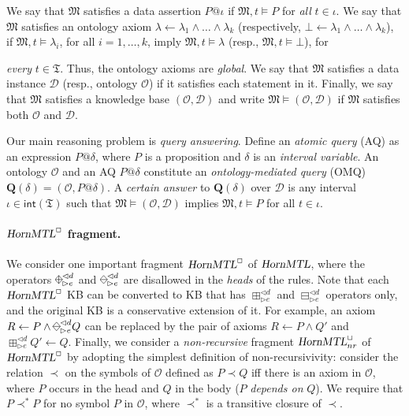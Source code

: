 \documentclass{article}
\newcommand{\Mmf}{\mathfrak{M}}
\renewcommand{\int}{\mathsf{int}}
\newcommand{\omq}{\boldsymbol Q}
\newcommand{\D}{\mathcal{D}}
\renewcommand{\O}{\mathcal{O}}
\newcommand{\diamondplus}{%
  \raisebox{-.15ex}{\begin{tikzpicture}
    \useasboundingbox (-0.7ex, -0.9ex) rectangle (0.7ex, 0.9ex);
    \node (w) at (-0.8ex,0) {};
    \node (e) at (+0.8ex,0) {};
    \node (s) at (0,-.9ex) {};
    \node (n) at (0,+.9ex) {};
    \draw (n.center) -- (e.center) -- (s.center) -- (w.center) -- (n.center);
    \draw (n.center) -- (s.center);
    \draw (e.center) -- (w.center);
  \end{tikzpicture}}}
\newcommand{\diamondminus}{%
  \raisebox{-.15ex}{\begin{tikzpicture}
    \useasboundingbox (-0.7ex, -0.9ex) rectangle (0.7ex, 0.9ex);
    \node (w) at (-0.8ex,0) {};
    \node (e) at (+0.8ex,0) {};
    \node (s) at (0,-.9ex) {};
    \node (n) at (0,+.9ex) {};
    \draw (n.center) -- (e.center) -- (s.center) -- (w.center) -- (n.center);
    \draw (e.center) -- (w.center);
  \end{tikzpicture}}}
\newcommand{\hMTL}{\textsl{HornMTL}}
\begin{document}
We say that $\Mmf$ satisfies a data assertion $P@\iota$ if $\Mmf, t \models P$ for \emph{all} $t \in \iota$. We say that $\Mmf$ satisfies an ontology axiom $\lambda \leftarrow \lambda_1 \land \dots \land \lambda_k$ (respectively, $\bot \leftarrow \lambda_1 \land \dots \land \lambda_k$), if $\Mmf, t \models \lambda_i$, for all $i = 1,\dots,k$, imply $\Mmf, t \models \lambda$ (resp., $\Mmf, t \models \bot$), for {\emph{every} $t \in \mathfrak{T}$.
Thus, the ontology axioms are \emph{global}. We say that $\Mmf$ satisfies a data instance $\D$ (resp., ontology $\O$) if it satisfies each statement in it. Finally, we say that $\Mmf$ satisfies a knowledge base $(\O, \D)$ and write $\Mmf \models (\O, \D)$ if $\Mmf$ satisfies both $\O$ and $\D$.

Our main reasoning problem is \emph{query answering}. Define an \emph{atomic query} (AQ) as an expression $P@\delta$, where $P$ is a proposition and $\delta$ is an \emph{interval variable}. An ontology $\O$ and an AQ $P@\delta$ constitute an \emph{ontology-mediated query} (OMQ) $\omq(\delta) = (\O,P@\delta)$. A \emph{certain answer} to $\omq(\delta)$ over $\D$ is any interval $\iota \in \int(\mathfrak{T})$ such that $\Mmf \models (\O, \D)$ implies $\Mmf, t \models P$ for all $t \in \iota$.

\paragraph{$\hMTL^\Box$ fragment.} We consider one important fragment $\hMTL^\Box$ of $\hMTL$, where the operators $\diamondplus^{\lhd d}_{\rhd e}$ and $\diamondminus^{\lhd d}_{\rhd e}$ are disallowed in the \emph{heads} of the rules. Note that each $\hMTL^\Box$ KB can be converted to KB that has $\boxplus^{\lhd d}_{\rhd e}$ and $\boxminus^{\lhd d}_{\rhd e}$ operators only, and the original KB is a conservative extension of it. For example, an axiom $R \leftarrow P \land \diamondminus^{\lhd d}_{\rhd e} Q$ can be replaced by the pair of axioms $R \leftarrow P \land Q'$ and $\boxplus^{\lhd d}_{\rhd e} Q' \leftarrow Q$. Finally, we consider a \emph{non-recursive} fragment $\hMTL^\Box_{nr}$ of $\hMTL^\Box$ by adopting the simplest definition of non-recursivivity: consider the relation $\prec$ on the symbols of $\O$ defined as $P \prec Q$ iff there is an axiom in $\O$, where $P$ occurs in the head and $Q$ in the body ($P$ \emph{depends on} $Q$). We require that $P \prec^* P$ for no symbol $P$ in $\O$, where $\prec^*$ is a transitive closure of $\prec$.

}
\end{document}
